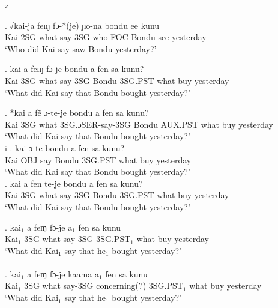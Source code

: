 z   \documentclass{assets/fieldnotes}
\begin{document}
\exg. √kai-ja feɱ fɔ-*(je) ɲo-na bondu ee kunu   \\
Kai-2SG what say-3SG who-FOC Bondu see yesterday\\
`Who did Kai say saw Bondu yesterday?'\\ 


\exg. kai a feɱ fɔ-je bondu a fen sa kunu?\\
Kai 3SG what say-3SG Bondu 3SG.PST what buy yesterday\\
`What did Kai say that Bondu bought yesterday?' \\ 


\exg. *kai a fẽ ɔ-te-je bondu a fen sa kunu?\\
Kai 3SG what 3SG.ɔSER-say-3SG Bondu AUX.PST what buy yesterday\\
`What did Kai say that Bondu bought yesterday?' \\ 
i
\exg. kai ɔ te bondu a fen sa kunu?\\
Kai OBJ say Bondu 3SG.PST what buy yesterday\\
`What did Kai say that Bondu bought yesterday?' \\

\exg. kai a fen te-je bondu a fen sa kunu?\\
Kai 3SG what say-3SG Bondu 3SG.PST what buy yesterday\\
`What did Kai say that Bondu bought yesterday?'  \\ 



\exg. kai$_{1}$ a feɱ fɔ-je a$_{1}$ fen sa kunu \\
Kai$_{1}$ 3SG what say-3SG 3SG.PST$_{1}$ what buy yesterday\\
`What did Kai$_{1}$ say that he$_{1}$ bought yesterday?' \\

\\

\exg. kai$_{1}$ a feɱ fɔ-je kaama a$_{1}$ fen sa kunu \\
Kai$_{1}$ 3SG what say-3SG concerning(?) 3SG.PST$_{1}$ what buy yesterday\\
`What did Kai$_{1}$ say that he$_{1}$ bought yesterday?' \\
\end{document}
